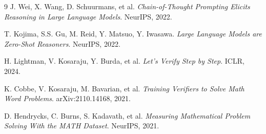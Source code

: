 \documentclass[11pt,a4paper]{article}
\begin{document}
\begin{thebibliography}{9}
J. Wei, X. Wang, D. Schuurmans, et al.
\textit{Chain-of-Thought Prompting Elicits Reasoning in Large Language Models}.
NeurIPS, 2022.

T. Kojima, S.S. Gu, M. Reid, Y. Matsuo, Y. Iwasawa.
\textit{Large Language Models are Zero-Shot Reasoners}.
NeurIPS, 2022.

H. Lightman, V. Kosaraju, Y. Burda, et al.
\textit{Let's Verify Step by Step}.
ICLR, 2024.

K. Cobbe, V. Kosaraju, M. Bavarian, et al.
\textit{Training Verifiers to Solve Math Word Problems}.
arXiv:2110.14168, 2021.

D. Hendrycks, C. Burns, S. Kadavath, et al.
\textit{Measuring Mathematical Problem Solving With the MATH Dataset}.
NeurIPS, 2021.
\end{thebibliography}
\end{document}
